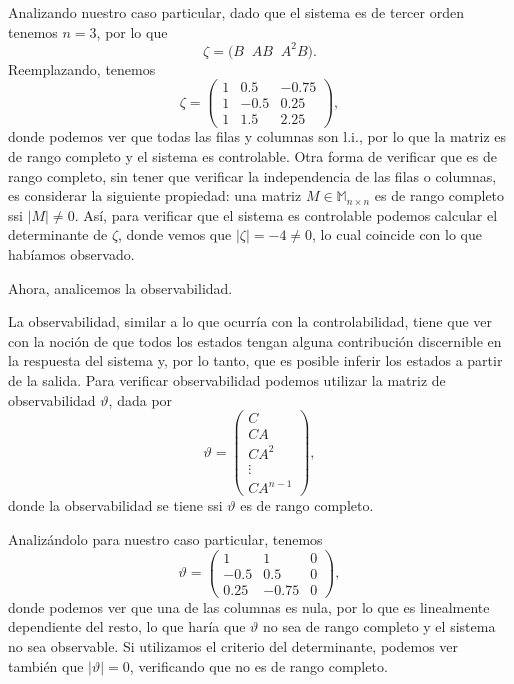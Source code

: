 \documentclass[
  11pt,
  letterpaper,
   addpoints,
  answers
  ]{exam}
\begin{document}
\begin{questions}
\begin{solution}
Analizando nuestro caso particular, dado que el sistema es de tercer orden tenemos $n=3$, por lo que
\begin{equation}
\zeta=\big( B\;\; AB\;\; A^{2}B \big).
\tag{20}
\end{equation}
Reemplazando, tenemos
\begin{equation}
\zeta=
\begin{pmatrix}
1 & 0.5 & -0.75\\
1 & -0.5 & 0.25\\
1 & 1.5 & 2.25
\end{pmatrix},
\tag{21}
\end{equation}
donde podemos ver que todas las filas y columnas son l.i., por lo que la matriz es de rango completo y el sistema es controlable. Otra forma de verificar que es de rango completo, sin tener que verificar la independencia de las filas o columnas, es considerar la siguiente propiedad: una matriz $M\in\mathbb{M}_{n\times n}$ es de rango completo ssi $|M|\neq 0$. Así, para verificar que el sistema es controlable podemos calcular el determinante de $\zeta$, donde vemos que $|\zeta|=-4\neq 0$, lo cual coincide con lo que habíamos observado.

Ahora, analicemos la observabilidad.

La observabilidad, similar a lo que ocurría con la controlabilidad, tiene que ver con la noción de que todos los estados tengan alguna contribución discernible en la respuesta del sistema y, por lo tanto, que es posible inferir los estados a partir de la salida. Para verificar observabilidad podemos utilizar la matriz de observabilidad $\vartheta$, dada por
\begin{equation}
\vartheta=
\begin{pmatrix}
C\\
CA\\
CA^{2}\\
\vdots\\
CA^{n-1}
\end{pmatrix},
\tag{22}
\end{equation}
donde la observabilidad se tiene ssi $\vartheta$ es de rango completo.

Analizándolo para nuestro caso particular, tenemos
\begin{equation}
\vartheta=
\begin{pmatrix}
1 & 1 & 0\\
-0.5 & 0.5 & 0\\
0.25 & -0.75 & 0
\end{pmatrix},
\tag{23}
\end{equation}
donde podemos ver que una de las columnas es nula, por lo que es linealmente dependiente del resto, lo que haría que $\vartheta$ no sea de rango completo y el sistema no sea observable. Si utilizamos el criterio del determinante, podemos ver también que $|\vartheta|=0$, verificando que no es de rango completo.


\end{solution}
\end{questions}
\end{document}
